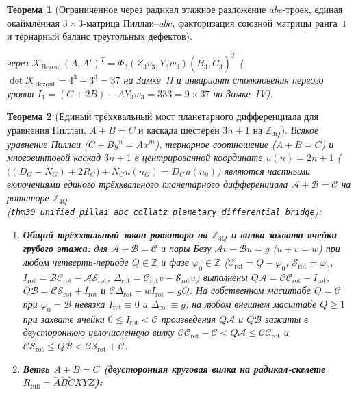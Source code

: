 \documentclass[11pt,a4paper]{article}
\theoremstyle{plain}
\newtheorem{theorem}{Теорема}[section]
\theoremstyle{definition}
\begin{document}
\begin{theorem}[Ограниченное через радикал этажное разложение $abc$-троек, единая окаймлённая $3\times 3$-матрица Пиллаи--$abc$, факторизация союзной матрицы ранга~$1$ и тернарный баланс треугольных дефектов]
\begin{enumerate}[label=\textbf{(\roman*)},leftmargin=*]
через $\mathcal{K}_{\mathrm{B\acute{e}zout}}(A,A')^T = \Phi_3(Z_3 v_3, Y_3 w_3)(\widetilde{B}_3,\widetilde{C}_3)^T$ ($\det\mathcal{K}_{\mathrm{B\acute{e}zout}} = 4^3-3^3 = 37$ на Замке~II и инвариант столкновения первого уровня $I_1 = (C+2B)-A Y_3 w_3 = 333 = 9\times 37$ на Замке~IV).
\end{enumerate}
\end{theorem}

\begin{theorem}[Единый трёххвальный мост планетарного дифференциала для уравнения Пиллаи, $A+B=C$ и каскада шестерён $3n+1$ на $\mathbb{Z}_{4Q}$]
\label{thm:main-30}
Всякое уравнение Пиллаи ($C + B y^n = A x^m$), тернарное соотношение ($A + B = C$) и многовинтовой каскад $3n+1$ в центрированной координате $u(n) = 2n+1$ ($\bigl((D_G - N_G) + 2R_G\bigr) + N_G u(n_G) = D_G u(n_0)$) являются частными включениями единого трёххвального планетарного дифференциала $\mathcal{A} + \mathcal{B} = \mathcal{C}$ на ротаторе $\mathbb{Z}_{4Q}$ (\texttt{thm30\_unified\_pillai\_abc\_collatz\_planetary\_differential\_bridge}):
\begin{enumerate}[label=\textbf{(\roman*)},leftmargin=*]
\item \textbf{Общий трёххвальный закон ротатора на $\mathbb{Z}_{4Q}$ и вилка захвата ячейки грубого этажа:}
  для $\mathcal{A} + \mathcal{B} = \mathcal{C}$ и пары Безу $\mathcal{A}v - \mathcal{B}u = g$ ($u+v=w$) при любом четверть-периоде $Q\in\mathbb{Z}$ и фазе $\varphi_0\in\mathbb{Z}$ ($\mathcal{C}_{\mathrm{rot}} = Q-\varphi_0$, $\mathcal{S}_{\mathrm{rot}} = \varphi_0$, $I_{\mathrm{rot}} = \mathcal{B}\mathcal{C}_{\mathrm{rot}} - \mathcal{A}\mathcal{S}_{\mathrm{rot}}$, $\Delta_{\mathrm{rot}} = \mathcal{C}_{\mathrm{rot}}v - \mathcal{S}_{\mathrm{rot}}u$) выполнены $Q\mathcal{A} = \mathcal{C}\mathcal{C}_{\mathrm{rot}} - I_{\mathrm{rot}}$, $Q\mathcal{B} = \mathcal{C}\mathcal{S}_{\mathrm{rot}} + I_{\mathrm{rot}}$ и $\mathcal{C}\Delta_{\mathrm{rot}} - w I_{\mathrm{rot}} = g Q$. На собственном масштабе $Q = \mathcal{C}$ при $\varphi_0 = \mathcal{B}$ невязка $I_{\mathrm{rot}} \equiv 0$ и $\Delta_{\mathrm{rot}} \equiv g$; на любом внешнем масштабе $Q\ge 1$ при захвате ячейки $0 \le I_{\mathrm{rot}} < \mathcal{C}$ произведения $Q\mathcal{A}$ и $Q\mathcal{B}$ зажаты в двустороннюю целочисленную вилку $\mathcal{C}\mathcal{C}_{\mathrm{rot}} - \mathcal{C} < Q\mathcal{A} \le \mathcal{C}\mathcal{C}_{\mathrm{rot}}$ и $\mathcal{C}\mathcal{S}_{\mathrm{rot}} \le Q\mathcal{B} < \mathcal{C}\mathcal{S}_{\mathrm{rot}} + \mathcal{C}$.
\item \textbf{Ветвь $A+B=C$ (двусторонняя круговая вилка на радикал-скелете $R_{\mathrm{full}} = \widetilde{A}\widetilde{B}\widetilde{C}XYZ$):}

\end{enumerate}
\end{theorem}
\end{document}

